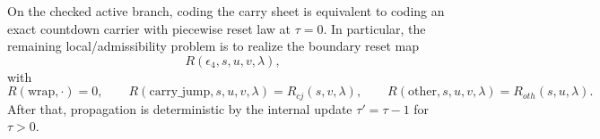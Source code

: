 \begin{corollary}\label{cor:d5-reset-law-coding}
On the checked active branch, coding the carry sheet is equivalent to coding an exact countdown carrier with piecewise reset law at $\tau=0$. In particular, the remaining local/admissibility problem is to realize the boundary reset map
\[
R(\epsilon_4,s,u,v,\lambda),
\]
with
\[
R(\mathrm{wrap},\cdot)=0,
\qquad
R(\mathrm{carry\_jump},s,u,v,\lambda)=R_{cj}(s,v,\lambda),
\qquad
R(\mathrm{other},s,u,v,\lambda)=R_{oth}(s,u,\lambda).
\]
After that, propagation is deterministic by the internal update $\tau' = \tau-1$ for $\tau>0$.
\end{corollary}
